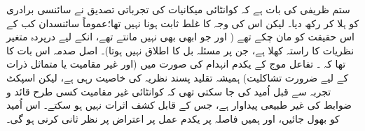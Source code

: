 ستم ظریفی کی بات ہے کہ کوانٹائی میکانیات کی تجرباتی تصدیق نے سائنسی برادری کو ہلا کر رکھ دیا۔ لیکن اس کی وجہ  کا غلط ثابت ہونا نہیں تھا؛عموماً سائنسدان کب کے اس حقیقت کو مان چکے تھے ( اور جو ابھی بھی نہیں مانتے تھے، انکے لیے  درپردہ متغیر نظریات کا راستہ کھلا ہے، جن پر مسئلہ بل کا اطلاق نہیں ہوتا)۔ اصل صدمہ اس بات کا تھا کہ ۔ تفاعل موج کے یکدم انہدام کی صورت میں (اور غیر مقامیت یا متماثل ذرات کے لیے ضرورت تشاکلیت) ہمیشہ تقلید پسند نظریہ کی خاصیت رہی ہے، لیکن اسپکٹ تجربہ سے قبل اُمید کی جا سکتی تھی کہ کوانٹائی غیر مقامیت کسی طرح قائد و ضوابط کی غیر طبیعی پیداوار ہے، جس کے قابل کشف اثرات نہیں ہو سکتے۔ اس اُمید کو بھول جائیں، اور ہمیں فاصلہ پر یکدم عمل پر اعتراض پر نظر ثانی کرنی ہو گی۔

